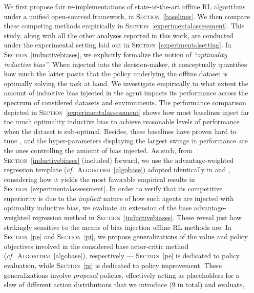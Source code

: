 We first propose fair re-implementations of state-of-the-art offline RL algorithms
under a unified open-sourced framework, in \textsc{Section}~\ref{baselines}.
We then compare these competing methods empirically in \textsc{Section}~\ref{experimentalassessment}.
This study, along with all the other analyses reported in this work, are conducted under the experimental
setting laid out in \textsc{Section}~\ref{experimentalsetting}.
In \textsc{Section}~\ref{inductivebiases},
we explicitly formalize the notion of \textit{``optimality inductive bias''}.
When injected into the decision-maker, it conceptually quantifies how much the latter
posits that the policy underlying the offline dataset is optimally solving the task at hand.
We investigate empirically to what extent the amount of inductive bias injected in the agent impacts
its performance across the spectrum of considered datasets and environments.
The performance comparison depicted in \textsc{Section}~\ref{experimentalassessment} shows how most baselines
inject far too much optimality inductive bias to achieve reasonable levels of performance when the
dataset is sub-optimal.
Besides, these baselines have proven hard to tune \cite{Wu2019-nl, Le_Paine2020-sb, Monier2020-tq},
and the hyper-parameters displaying the largest swings in performance are the ones
controlling the amount of bias injected.
As such, from \textsc{Section}~\ref{inductivebiases} (included) forward, we use the advantage-weighted regression
template (\textit{cf.}~\textsc{Algorithm}~\ref{algobase})
adopted identically in \cite{Wang2020-sr}
and \cite{Nair2020-gd},
considering how it yields the most favorable empirical results in \textsc{Section}~\ref{experimentalassessment}.
In order to verify that its competitive superiority is due to the
\emph{implicit} nature of how such agents are injected with
optimality inductive bias,
we evaluate an extension of the base advantage-weighted regression method in
\textsc{Section}~\ref{inductivebiases}.
These reveal just how strikingly
sensitive to the means of bias injection offline RL methods are.
In \textsc{Section}~\ref{pe} and \textsc{Section}~\ref{pi},
we propose generalizations of the value and policy objectives involved in the considered base actor-critic
method (\textit{cf.}~\textsc{Algorithm}~\ref{algobase}), respectively
--- \textsc{Section}~\ref{pe} is dedicated to policy evaluation,
while \textsc{Section}~\ref{pi} is dedicated to policy improvement.
These generalizations involve \emph{proposal} policies,
effectively acting as placeholders for a slew of different
action distributions that we introduce (9 in total) and evaluate,
